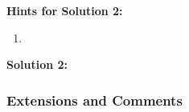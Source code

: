 \textbf{Hints for Solution 2:}

\begin{enumerate}
    \item 
\end{enumerate}

\textbf{Solution 2:}



\subsubsection{Extensions and Comments}